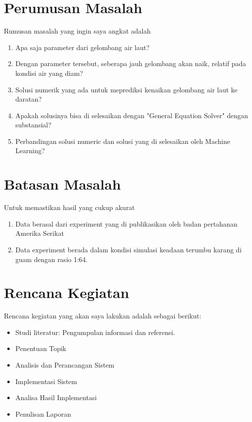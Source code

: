 \section{Perumusan Masalah}
Rumusan masalah yang ingin saya angkat adalah
\begin{enumerate}
    \item Apa saja parameter dari gelombang air laut?
    \item Dengan parameter tersebut, seberapa jauh gelombang akan naik, relatif pada kondisi air yang diam?
    \item Solusi numerik yang ada untuk meprediksi kenaikan gelombang air laut ke daratan?
    \item Apakah solusinya bisa di selesaikan dengan "General Equation Solver" dengan substansial?
    \item Perbandingan solusi numeric dan solusi yang di selesaikan oleh Machine Learning?
\end{enumerate}
\section{Batasan Masalah}
Untuk memastikan hasil yang cukup akurat
\begin{enumerate}
    \item Data berasal dari experiment yang di publikasikan oleh badan pertahanan Amerika Serikat
    \item Data experiment berada dalam kondisi simulasi keadaan terumbu karang di guam dengan rasio 1:64.
\end{enumerate}
\section{Rencana Kegiatan}
Rencana kegiatan yang akan saya lakukan adalah sebagai berikut:
\begin{itemize}
    \item Studi literatur: Pengumpulan informasi dan referensi.
    \item Penentuan Topik
    \item Analisis dan Perancangan Sistem
    \item Implementasi Sistem
    \item Analisa Hasil Implementasi
    \item Penulisan Laporan
\end{itemize}
